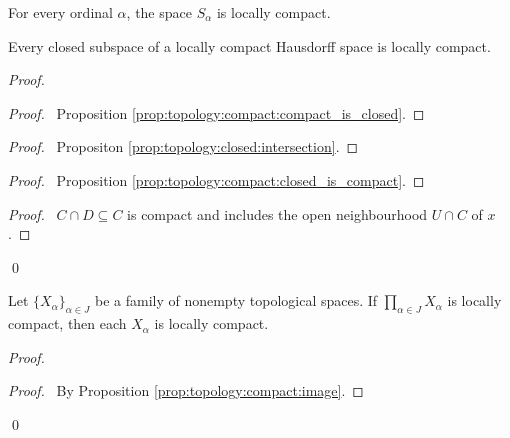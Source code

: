 \begin{cor}
For every ordinal $\alpha$, the space $S_\alpha$ is locally compact.
\end{cor}


\begin{thm}
  \label{thm:topology:locally_compact:closed_subspace}
  Every closed subspace of a locally compact Hausdorff space is locally
  compact.
\end{thm}

\begin{proof}
  \pf
  \begin{proof}
    \pf\ Proposition \ref{prop:topology:compact:compact_is_closed}.
  \end{proof}
  \begin{proof}
    \pf\ Propositon \ref{prop:topology:closed:intersection}.
  \end{proof}
  \begin{proof}
    \pf\ Proposition \ref{prop:topology:compact:closed_is_compact}.
  \end{proof}
  \qedstep
  \begin{proof}
    \pf\ $C \cap D \subseteq C$ is compact and includes the open
    neighbourhood
    $U \cap C$ of $x$.
  \end{proof}
  \qed
\end{proof}

 \begin{prop}
 Let $\{X_\alpha\}_{\alpha \in J}$ be a family of nonempty topological
spaces. If    $\prod_{\alpha \in J} X_\alpha$ is locally compact, then each
$X_\alpha$ is locally compact.
\end{prop}

\begin{proof}
\pf
{}
\begin{proof}
  \pf\ By Proposition \ref{prop:topology:compact:image}.
\end{proof}
\qed
\end{proof}


